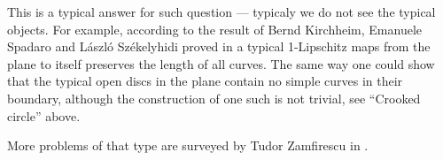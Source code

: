 This is a typical answer for such question --- typicaly we do not see the typical objects.
For example, according to the result of 
Bernd Kirchheim, 
Emanuele Spadaro  
and 
L{\'a}szl{\'o} Sz{\'e}kelyhidi proved in \cite{KSS}
a typical 1-Lipschitz maps from the plane to itself preserves the length of all curves.
The same way one could show that the typical open discs in the plane contain no simple curves in their boundary, 
although the construction of one such is not trivial, 
see ``Crooked circle'' above.

More problems of that type are surveyed by Tudor Zamfirescu in \cite{zamfirescu}.







